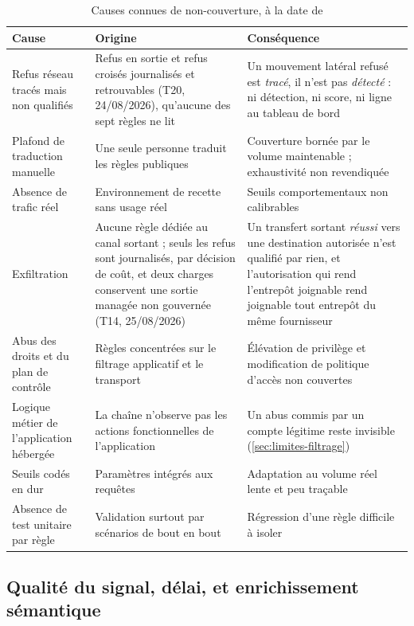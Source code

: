 \begin{table}[!htbp]
\caption[Causes connues de non-couverture]{Causes connues de non-couverture, à la date de \dateref}
\label{tab:lacunes}
\centering
\footnotesize
\setlength{\tabcolsep}{3pt}
\begin{tabular}{|P{3.1cm}|P{4.5cm}|P{7.7cm}|}
\hline
\textbf{Cause} & \textbf{Origine} & \textbf{Conséquence} \\
\hline
Refus réseau tracés mais non qualifiés & Refus en sortie et refus croisés journalisés et
retrouvables (T20, 24/08/2026), qu'aucune des sept règles ne lit & Un mouvement latéral refusé est
\emph{tracé}, il n'est pas \emph{détecté} : ni détection, ni score, ni ligne au tableau de
bord \\ \hline
Plafond de traduction manuelle & Une seule personne traduit les règles publiques & Couverture
bornée par le volume maintenable ; exhaustivité non revendiquée \\ \hline
Absence de trafic réel & Environnement de recette sans usage réel & Seuils comportementaux non
calibrables \\ \hline
Exfiltration & Aucune règle dédiée au canal sortant ; seuls les refus sont journalisés, par
décision de coût, et deux charges conservent une sortie managée non gouvernée (T14, 25/08/2026) &
Un transfert sortant \emph{réussi} vers une destination autorisée n'est qualifié par rien, et
l'autorisation qui rend l'entrepôt joignable rend joignable tout entrepôt du même
fournisseur \\ \hline
Abus des droits et du plan de contrôle & Règles concentrées sur le filtrage applicatif et le
transport & Élévation de privilège et modification de politique d'accès non couvertes \\ \hline
Logique métier de l'application hébergée & La chaîne n'observe pas les actions fonctionnelles de
l'application & Un abus commis par un compte légitime reste invisible
(\cref{sec:limites-filtrage}) \\ \hline
Seuils codés en dur & Paramètres intégrés aux requêtes & Adaptation au volume réel lente et peu
traçable \\ \hline
Absence de test unitaire par règle & Validation surtout par scénarios de bout en bout &
Régression d'une règle difficile à isoler \\
\hline
\end{tabular}
\end{table}

\subsection{Qualité du signal, délai, et enrichissement sémantique}
\label{sec:eval-enrichissement}

